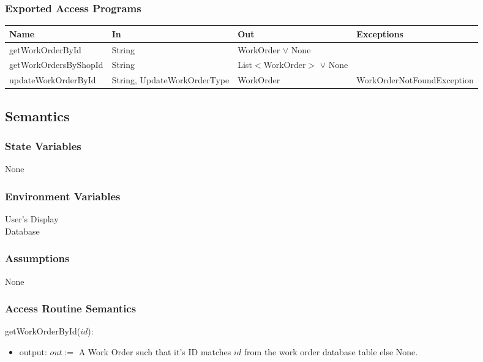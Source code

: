 \documentclass[12pt, titlepage]{article}
\begin{document}
\subsubsection{Exported Access Programs}

\begin{center}
	\begin{adjustbox}{width=\textwidth}
		\begin{tabular}{llll}
			\hline
			\textbf{Name}         & \textbf{In}                 & \textbf{Out}                    & \textbf{Exceptions}        \\
			\hline
			getWorkOrderById      & String                      & WorkOrder $\lor$ None           & ~                          \\
			getWorkOrdersByShopId & String                      & List$<$WorkOrder$>$ $\lor$ None & ~                          \\
			updateWorkOrderById   & String, UpdateWorkOrderType & WorkOrder                       & WorkOrderNotFoundException \\
			\hline
		\end{tabular}
	\end{adjustbox}
\end{center}

\subsection{Semantics}

\subsubsection{State Variables}

None

\subsubsection{Environment Variables}

User's Display \\ Database

\subsubsection{Assumptions}

None

\subsubsection{Access Routine Semantics}
\noindent getWorkOrderById($id$):
\begin{itemize}
	\item output: $out :=$ A Work Order such that it's ID matches $id$ from the work order database table
	      else None.
\end{itemize}
\end{document}
